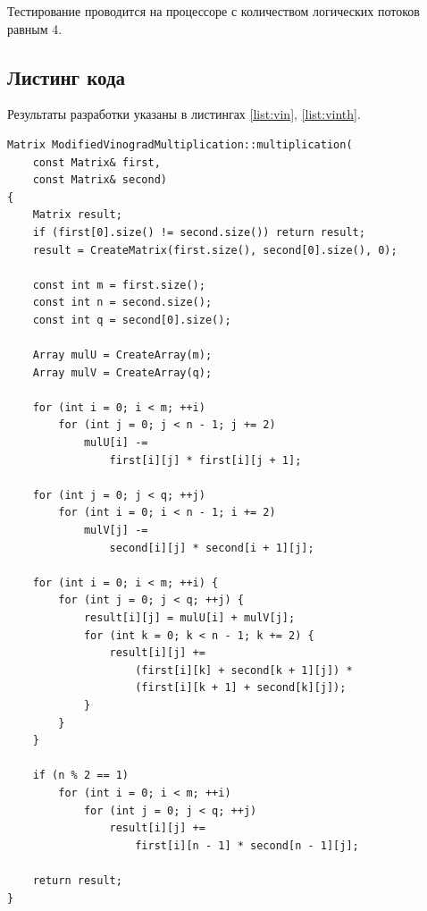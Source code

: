 \documentclass[a4paper,12pt]{article}
\begin{document}
Тестирование проводится на процессоре с количеством логических потоков равным 4.

\subsection{Листинг кода}

Результаты разработки указаны в листингах \ref{list:vin}, \ref{list:vinth}.

\begin{lstlisting}[caption=Алгоритм Винограда умножения матриц,label=list:vin]
Matrix ModifiedVinogradMultiplication::multiplication(
    const Matrix& first,
    const Matrix& second)
{
    Matrix result;
    if (first[0].size() != second.size()) return result;
    result = CreateMatrix(first.size(), second[0].size(), 0);

    const int m = first.size();
    const int n = second.size();
    const int q = second[0].size();

    Array mulU = CreateArray(m);
    Array mulV = CreateArray(q);

    for (int i = 0; i < m; ++i)
        for (int j = 0; j < n - 1; j += 2)
            mulU[i] -=
                first[i][j] * first[i][j + 1];

    for (int j = 0; j < q; ++j)
        for (int i = 0; i < n - 1; i += 2)
            mulV[j] -=
                second[i][j] * second[i + 1][j];

    for (int i = 0; i < m; ++i) {
        for (int j = 0; j < q; ++j) {
            result[i][j] = mulU[i] + mulV[j];
            for (int k = 0; k < n - 1; k += 2) {
                result[i][j] +=
                    (first[i][k] + second[k + 1][j]) *
                    (first[i][k + 1] + second[k][j]);
            }
        }
    }

    if (n % 2 == 1)
        for (int i = 0; i < m; ++i)
            for (int j = 0; j < q; ++j)
                result[i][j] +=
                    first[i][n - 1] * second[n - 1][j];

    return result;
}
\end{lstlisting}
\end{document}
